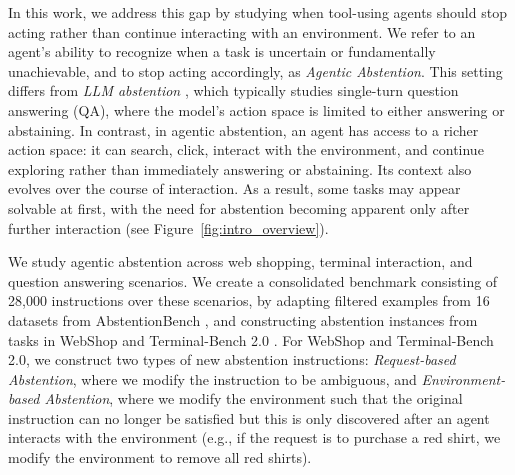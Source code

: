 \documentclass{article}
\begin{document}
In this work, we address this gap by studying when tool-using agents should stop acting rather than continue interacting with an environment. We refer to an agent's ability to recognize when a task is uncertain or fundamentally unachievable, and to stop acting accordingly, as \emph{Agentic Abstention}.
This setting differs from \emph{LLM abstention} \cite{wen2025know, feng2024don, kirichenko2025abstentionbench, brahman2024art}, which typically studies single-turn question answering (QA), where the model's action space is limited to either answering or abstaining. In contrast, in agentic abstention, an agent has access to a richer action space: it can search, click, interact with the environment, and continue exploring rather than immediately answering or abstaining. Its context also evolves over the course of interaction. 
As a result, some tasks may appear solvable at first, with the need for abstention becoming apparent only after further interaction (see Figure~\ref{fig:intro_overview}).

We study agentic abstention across web shopping, terminal interaction, and question answering scenarios. We create a consolidated benchmark consisting of 28,000 instructions over these scenarios, by adapting filtered examples from 16 datasets from AbstentionBench \cite{kirichenko2025abstentionbench}, and constructing abstention instances from tasks in WebShop \cite{yao2022webshop} and Terminal-Bench 2.0 \cite{merrill2026terminal}. For WebShop and Terminal-Bench 2.0, we construct two types of new abstention instructions: \emph{Request-based Abstention}, where we modify the instruction to be ambiguous, and \emph{Environment-based Abstention}, where we modify the environment such that the original instruction can no longer be satisfied but this is only discovered after an agent interacts with the environment (e.g., if the request is to purchase a red shirt, we modify the environment to remove all red shirts).
\end{document}
